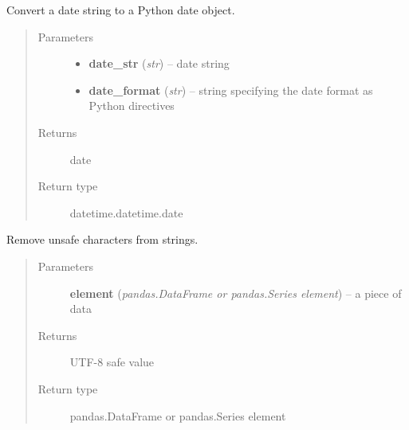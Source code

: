 \documentclass[letterpaper,10pt,english]{sphinxmanual}
\begin{document}
\begin{fulllineitems}
\label{modules:webb_utils.upload_data.str_to_date}
Convert a date string to a Python date object.
\begin{quote}\begin{description}
\item[{Parameters}] \leavevmode\begin{itemize}
\item {} 
\textbf{date\_str} (\emph{str}) -- date string

\item {} 
\textbf{date\_format} (\emph{str}) -- string specifying the date format as Python directives

\end{itemize}

\item[{Returns}] \leavevmode
date

\item[{Return type}] \leavevmode
datetime.datetime.date

\end{description}\end{quote}

\end{fulllineitems}


\begin{fulllineitems}
\label{modules:webb_utils.upload_data.clean_string_elements}
Remove unsafe characters from strings.
\begin{quote}\begin{description}
\item[{Parameters}] \leavevmode
\textbf{element} (\emph{pandas.DataFrame or pandas.Series element}) -- a piece of data

\item[{Returns}] \leavevmode
UTF-8 safe value

\item[{Return type}] \leavevmode
pandas.DataFrame or pandas.Series element

\end{description}\end{quote}

\end{fulllineitems}
\end{document}

